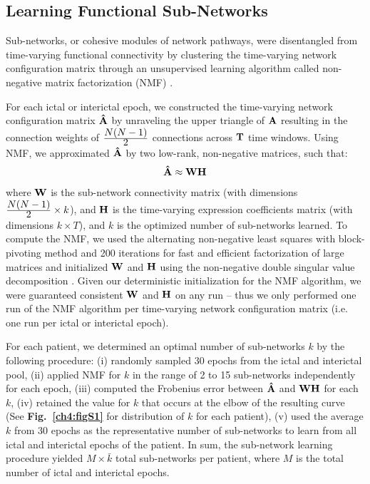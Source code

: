 \subsection{Learning Functional Sub-Networks}
Sub-networks, or cohesive modules of network pathways, were disentangled from time-varying functional connectivity by clustering the time-varying network configuration matrix through an unsupervised learning algorithm called non-negative matrix factorization (NMF) \cite{lee1999learning}. 

For each ictal or interictal epoch, we constructed the time-varying network configuration matrix $\mathbf{\displaystyle \hat A}$ by unraveling the upper triangle of $\mathbf{\displaystyle A}$ resulting in the connection weights of $\frac{\displaystyle N(N-1)}{\displaystyle 2}$ connections across $\mathbf{\displaystyle T}$ time windows. Using NMF, we approximated $\mathbf{\displaystyle \hat A}$ by two low-rank, non-negative matrices, such that:
\begin{eqnarray}
    \mathbf{\displaystyle \hat A} \approx \mathbf{\displaystyle W}\mathbf{\displaystyle H}
\end{eqnarray}
where $\mathbf{\displaystyle W}$ is the sub-network connectivity matrix (with dimensions $\frac{\displaystyle N(N-1)}{\displaystyle 2} \times k$), and $\mathbf{\displaystyle H}$ is the time-varying expression coefficients matrix (with dimensions $k \times T$), and $k$ is the optimized number of sub-networks learned. To compute the NMF, we used the alternating non-negative least squares with block-pivoting method and 200 iterations for fast and efficient factorization of large matrices \cite{kim2011fast} and initialized $\mathbf{\displaystyle W}$ and $\mathbf{\displaystyle H}$ using the non-negative double singular value decomposition \cite{boutsidis2008svd}. Given our deterministic initialization for the NMF algorithm, we were guaranteed consistent $\mathbf{\displaystyle W}$ and $\mathbf{\displaystyle H}$ on any run -- thus we only performed one run of the NMF algorithm per time-varying network configuration matrix (i.e. one run per ictal or interictal epoch).

For each patient, we determined an optimal number of sub-networks $k$ by the following procedure: (i) randomly sampled 30 epochs from the ictal and interictal pool, (ii) applied NMF for $k$ in the range of 2 to 15 sub-networks independently for each epoch, (iii) computed the Frobenius error between $\mathbf{\displaystyle \hat A}$ and $\mathbf{\displaystyle W}\mathbf{\displaystyle H}$ for each $k$, (iv) retained the value for $k$ that occurs at the elbow of the resulting curve (See \textbf{Fig.~\ref{ch4:figS1}} for distribution of $k$ for each patient), (v) used the average $k$ from 30 epochs as the representative number of sub-networks to learn from all ictal and interictal epochs of the patient. In sum, the sub-network learning procedure yielded $M\times\bar{k}$ total sub-networks per patient, where $M$ is the total number of ictal and interictal epochs. 


